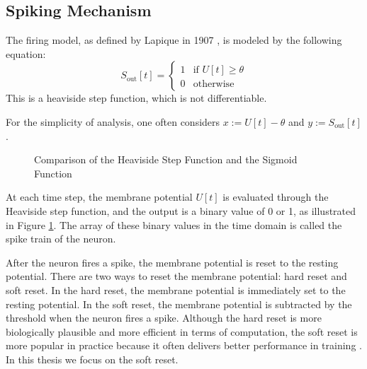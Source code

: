     \subsection{Spiking Mechanism}
    \label{subsec:lif_spiking}
        The firing model, as defined by Lapique in 1907 \cite{lapicque1907louis}, is modeled by the following equation:
        \begin{equation}
            S_{\text{out}}[t] = \begin{cases}
                1 & \text{if } U[t] \geq \theta \\
                0 & \text{otherwise}
            \end{cases}
        \end{equation}
        This is a heaviside step function, which is not differentiable. 

        For the simplicity of analysis, one often considers $x := U[t] - \theta$ and $y := S_{\text{out}}[t]$.
        \begin{figure}[!htpb]
            \centering
            \caption{Comparison of the Heaviside Step Function and the Sigmoid Function}
            \label{fig:heaviside_sigmoid}
        \end{figure}
        At each time step, the membrane potential $U[t]$ is evaluated through the Heaviside step function, and the output is a binary value of 0 or 1, as illustrated in Figure \ref{fig:heaviside_sigmoid}. The array of these binary values in the time domain is called the spike train of the neuron. 

        After the neuron fires a spike, the membrane potential is reset to the resting potential. There are two ways to reset the membrane potential: hard reset and soft reset. In the hard reset, the membrane potential is immediately set to the resting potential. In the soft reset, the membrane potential is subtracted by the threshold when the neuron fires a spike. Although the hard reset is more biologically plausible and more efficient in terms of computation, the soft reset is more popular in practice because it often delivers better performance in training \cite{10242251}. In this thesis we focus on the soft reset.

